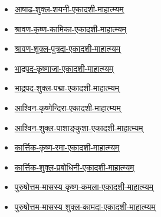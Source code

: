 {\begin{center}
\begin{itemize}
        \item \hyperref[sec:padma-ashadha-shukla-shayani]{आषाढ-शुक्ल-शयनी-एकादशी-माहात्म्यम्}
        \item \hyperref[sec:padma-shravana-krishna-kamika]{श्रावण-कृष्ण-कामिका-एकादशी-माहात्म्यम्}
        \item \hyperref[sec:padma-shravana-shukla-putrada]{श्रावण-शुक्ल-पुत्रदा-एकादशी-माहात्म्यम्}
        \item \hyperref[sec:padma-bhadrapada-krishnaja]{भाद्रपद-कृष्णाजा-एकादशी-माहात्म्यम्}
        \item \hyperref[sec:padma-bhadrapada-shukla-padma]{भाद्रपद-शुक्ल-पद्मा-एकादशी-माहात्म्यम्}
        \item \hyperref[sec:padma-ashvina-krishnendira]{आश्विन-कृष्णेन्दिरा-एकादशी-माहात्म्यम्}
        \item \hyperref[sec:padma-ashvina-shukla-pashankusha]{आश्विन-शुक्ल-पाशाङ्कुशा-एकादशी-माहात्म्यम्}
        \item \hyperref[sec:padma-karttika-krishna-rama]{कार्त्तिक-कृष्ण-रमा-एकादशी-माहात्म्यम्}
        \item \hyperref[sec:padma-karttika-shukla-prabodhini]{कार्त्तिक-शुक्ल-प्रबोधिनी-एकादशी-माहात्म्यम्}
        \item \hyperref[sec:padma-purushottama-masasya krishna-kamala]{पुरुषोत्तम-मासस्य कृष्ण-कमला-एकादशी-माहात्म्यम्}
        \item \hyperref[sec:padma-purushottama-masasya shukla-kamada]{पुरुषोत्तम-मासस्य शुक्ल-कामदा-एकादशी-माहात्म्यम्}
    \end{itemize}
    \clearpage
    
\end{center}

\clearpage

}
